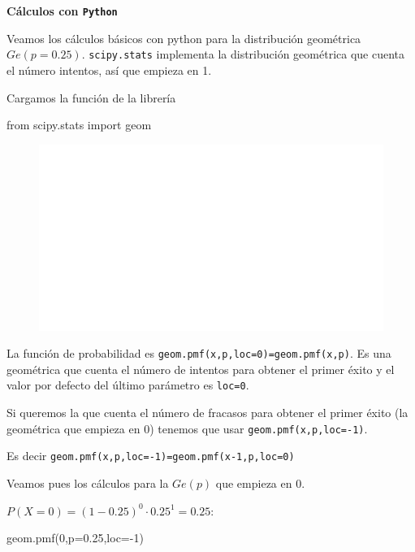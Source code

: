 \documentclass[
  letterpaper,
  DIV=11,
  numbers=noendperiod]{scrreprt}
\newenvironment{Shaded}{\begin{snugshade}}{\end{snugshade}}
\newcommand{\DecValTok}[1]{\textcolor[rgb]{0.68,0.00,0.00}{#1}}
\newcommand{\FloatTok}[1]{\textcolor[rgb]{0.68,0.00,0.00}{#1}}
\newcommand{\ImportTok}[1]{\textcolor[rgb]{0.00,0.46,0.62}{#1}}
\newcommand{\NormalTok}[1]{\textcolor[rgb]{0.00,0.23,0.31}{#1}}
\newcommand{\OperatorTok}[1]{\textcolor[rgb]{0.37,0.37,0.37}{#1}}
\begin{document}
\textbf{Cálculos con \texttt{Python}}

Veamos los cálculos básicos con python para la distribución geométrica
\(Ge(p=0.25)\). \texttt{scipy.stats} implementa la distribución
geométrica que cuenta el número intentos, así que empieza en 1.

Cargamos la función de la librería

\begin{Shaded}
\begin{Highlighting}[]
\ImportTok{from}\NormalTok{ scipy.stats }\ImportTok{import}\NormalTok{ geom}
\end{Highlighting}
\end{Shaded}

\begin{figure}[H]

{\centering \includegraphics{3_files/figure-pdf/geom1-1.pdf}

}

\end{figure}

La función de probabilidad es
\texttt{geom.pmf(x,p,loc=0)=geom.pmf(x,p)}. Es una geométrica que cuenta
el número de intentos para obtener el primer éxito y el valor por
defecto del último parámetro es \texttt{loc=0}.

Si queremos la que cuenta el número de fracasos para obtener el primer
éxito (la geométrica que empieza en 0) tenemos que usar
\texttt{geom.pmf(x,p,loc=-1)}.

Es decir \texttt{geom.pmf(x,p,loc=-1)=geom.pmf(x-1,p,loc=0)}

Veamos pues los cálculos para la \(Ge(p)\) que empieza en \(0\).

\(P(X=0)=(1-0.25)^0\cdot 0.25^1=0.25\):

\begin{Shaded}
\begin{Highlighting}[]
\NormalTok{geom.pmf(}\DecValTok{0}\NormalTok{,p}\OperatorTok{=}\FloatTok{0.25}\NormalTok{,loc}\OperatorTok{={-}}\DecValTok{1}\NormalTok{)}
\end{Highlighting}
\end{Shaded}
\end{document}
